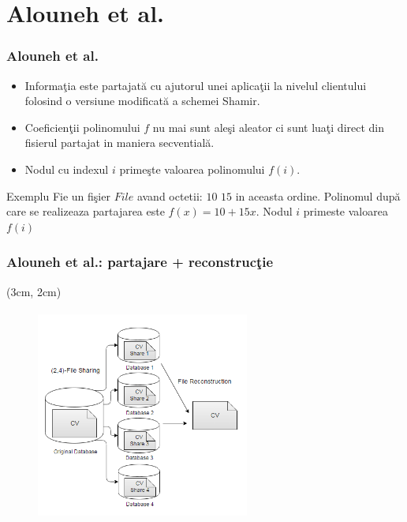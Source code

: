 \documentclass{beamer}
\theoremstyle{definition}
\begin{document}
\section{Alouneh et al.}
\begin{frame}
    \frametitle{Alouneh et al.}
    \begin{itemize}
        \item Informa\c{t}ia este partajat\u{a} cu ajutorul unei aplica\c{t}ii la nivelul clientului folosind o versiune modificat\u{a} a schemei Shamir.
        \pause
        \item Coeficien\c{t}ii polinomului $f$ nu mai sunt ale\c{s}i aleator ci sunt lua\c{t}i direct din fisierul partajat in maniera secvential\u{a}.
        \pause
        \item Nodul cu indexul $i$ prime\c{s}te valoarea polinomului $f(i)$.
    \end{itemize} 
    \pause
    \begin{exampleblock}{Exemplu}
        Fie un fi\c{s}ier $File$ avand octetii: $10$ $15$ in aceasta ordine.
        Polinomul dup\u{a} care se realizeaza partajarea este $f(x) = 10 + 15x$.
        Nodul $i$ primeste valoarea $f(i)$
    \end{exampleblock}
\end{frame}
\begin{frame}
    \frametitle{Alouneh et al.: partajare + reconstruc\c{t}ie}
     \begin{textblock*}{4cm}(3cm, 2cm)
        \begin{figure}
            \includegraphics[width=7cm,height=7cm,keepaspectratio]{img/results/sharing.png}
       \end{figure}
    \end{textblock*}
\end{frame}
\end{document}
